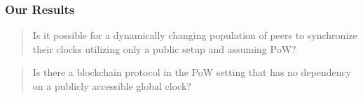 \begin{frame}
    \frametitle{Our Results}

    \begin{quote}
        Is it possible for a dynamically changing population of peers to synchronize their clocks utilizing only a public setup and assuming PoW?
    \end{quote}

    \vspace*{.1in}

    \begin{quote}
        Is there a blockchain protocol in the PoW setting that has no dependency on a publicly accessible global clock?
    \end{quote}

    \vspace*{.2in}

\end{frame}
